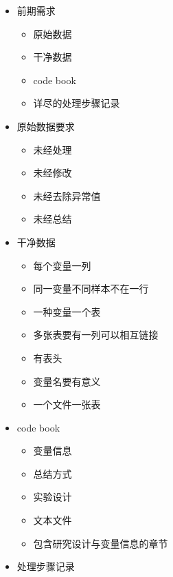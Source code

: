 \documentclass[
]{book}
\providecommand{\tightlist}{%
  \setlength{\itemsep}{0pt}\setlength{\parskip}{0pt}}
\begin{document}
\begin{itemize}
\tightlist
\item
  前期需求

  \begin{itemize}
  \tightlist
  \item
    原始数据
  \item
    干净数据
  \item
    code book
  \item
    详尽的处理步骤记录
  \end{itemize}
\item
  原始数据要求

  \begin{itemize}
  \tightlist
  \item
    未经处理
  \item
    未经修改
  \item
    未经去除异常值
  \item
    未经总结
  \end{itemize}
\item
  干净数据

  \begin{itemize}
  \tightlist
  \item
    每个变量一列
  \item
    同一变量不同样本不在一行
  \item
    一种变量一个表
  \item
    多张表要有一列可以相互链接
  \item
    有表头
  \item
    变量名要有意义
  \item
    一个文件一张表
  \end{itemize}
\item
  code book

  \begin{itemize}
  \tightlist
  \item
    变量信息
  \item
    总结方式
  \item
    实验设计
  \item
    文本文件
  \item
    包含研究设计与变量信息的章节
  \end{itemize}
\item
  处理步骤记录


\end{itemize}
\end{document}
